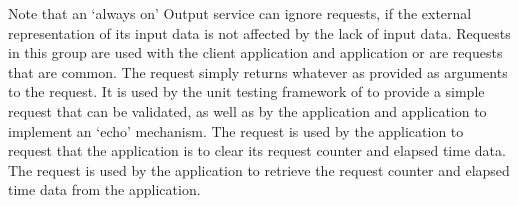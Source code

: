 Note that an `always on' Output service can ignore
 requests, if the external
representation of its input data is not affected by the lack of input data.
\secondaryEnd{}
Requests in this group are used with the  client
application and  application or are requests that
are common.
The  request simply returns whatever
as provided as arguments to the request.
It is used by the unit testing framework of \mplusm{} to provide a simple request that
can be validated, as well as by the  application
and  application to implement an `echo' mechanism.
The  request is used by the
 application to request that the
 application is to clear its request counter and
elapsed time data.
The  request is used by the
 application to retrieve the request counter and
elapsed time data from the  application.
\secondaryEnd{}
\primaryEnd{}

